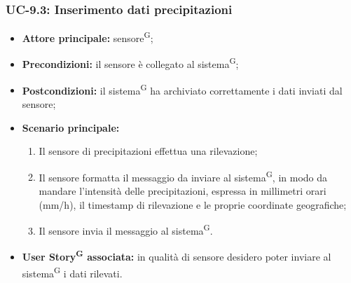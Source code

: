 \documentclass[8pt]{article}
\newcommand{\glossterm}[1]{#1\textsuperscript{G}} %
\begin{document}
\subsubsection*{UC-9.3: Inserimento dati precipitazioni}
\begin{itemize}
    \item \textbf{Attore principale:} \glossterm{sensore};
    \item \textbf{Precondizioni:} il sensore è collegato al \glossterm{sistema};
    \item \textbf{Postcondizioni:} il \glossterm{sistema} ha archiviato correttamente i dati inviati dal sensore;
    \item \textbf{Scenario principale:}
        \begin{enumerate}
        \item Il sensore di precipitazioni effettua una rilevazione;
        \item Il sensore formatta il messaggio da inviare al \glossterm{sistema}, in modo da mandare l'intensità delle precipitazioni, espressa in millimetri orari (mm/h), il timestamp di rilevazione e le proprie
coordinate geografiche;
        \item Il sensore invia il messaggio al \glossterm{sistema}.
        \end{enumerate}
    \item \textbf{\glossterm{User Story} associata:} in qualità di sensore desidero poter inviare al \glossterm{sistema} i dati rilevati.
\end{itemize}
\end{document}
